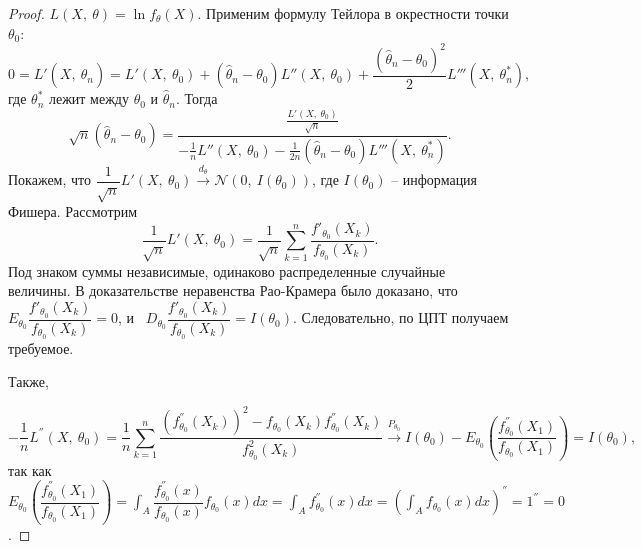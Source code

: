 \begin{proof}
    $\displaystyle L( X,\ \theta ) =\ln f_\theta(X)$. Применим формулу Тейлора в окрестности точки $\displaystyle \theta _{0}$:
    \begin{equation*}
        0=L'( X,\ \hat{\theta }_{n}) =L'( X,\ \theta _{0}) +(\hat{\theta }_{n} -\theta _{0}) L''( X,\ \theta_0) +\dfrac{(\hat{\theta }_{n} -\theta _{0})^{2}}{2} L'''\left( X,\ \theta _{n}^{*}\right) ,
    \end{equation*}
    где $\displaystyle \theta _{n}^{*}$ лежит между $\displaystyle \theta _{0}$ и $\displaystyle \hat{\theta }_{n}$. Тогда 
    \begin{equation*}
        \sqrt{n}(\hat{\theta }_{n} -\theta _{0}) =\dfrac{\frac{L'( X,\ \theta _{0})}{\sqrt{n}}}{-\frac{1}{n} L''( X,\ \theta _{0}) -\frac{1}{2n}(\hat{\theta }_{n} -\theta _{0}) L'''\left( X,\ \theta _{n}^{*}\right)} .
    \end{equation*}
    Покажем, что $\displaystyle \dfrac{1}{\sqrt{n}} L'( X,\ \theta _{0})\xrightarrow{d_{\theta }}\mathcal{N}( 0,\ I( \theta _{0}))$, где $\displaystyle I( \theta _{0})$ -- информация Фишера. Рассмотрим
    \begin{equation*}
        \dfrac{1}{\sqrt{n}} L'( X,\ \theta _{0}) =\dfrac{1}{\sqrt{n}}\sum _{k=1}^{n}\dfrac{f'_{\theta _{0}}( X_{k})}{f_{\theta _{0}}( X_{k})} .
    \end{equation*}
    Под знаком суммы независимые, одинаково распределенные случайные величины. В доказательстве неравенства Рао-Крамера было доказано, что $\displaystyle E_{\theta _{0}}\dfrac{f'_{\theta _{0}}( X_{k})}{f_{\theta _{0}}( X_{k})} =0$, и \ $\displaystyle D_{\theta _{0}}\dfrac{f'_{\theta _{0}}( X_{k})}{f_{\theta _{0}}( X_{k})} =I( \theta _{0})$. Следовательно, по ЦПТ получаем требуемое.
    
    Также,
    
    
    \begin{equation*}
        -\dfrac{1}{n} L^{''}( X,\ \theta _{0}) =\dfrac{1}{n}\sum _{k=1}^{n}\dfrac{\left( f_{\theta _{0}}^{''}( X_{k})\right)^{2} -f_{\theta _{0}}( X_{k}) f_{\theta _{0}}^{''}( X_{k})}{f_{\theta _{0}}^{2}( X_{k})}\xrightarrow{P_{\theta _{0}}} I( \theta _{0}) -E_{\theta _{0}}\left(\dfrac{f_{\theta _{0}}^{''}( X_{1})}{f_{\theta _{0}}( X_{1})}\right) =I( \theta _{0}) ,
    \end{equation*}
    так как $\displaystyle E_{\theta _{0}}\left(\dfrac{f_{\theta _{0}}^{''}( X_{1})}{f_{\theta _{0}}( X_{1})}\right) =\int _{A}\dfrac{f_{\theta _{0}}^{''}( x)}{f_{\theta _{0}}( x)} f_{\theta _{0}}( x) dx=\int _{A} f_{\theta _{0}}^{''}( x) dx=\left(\int _{A} f_{\theta _{0}}( x)dx\right)^{''} =1^{''} =0$.
    

\end{proof}
